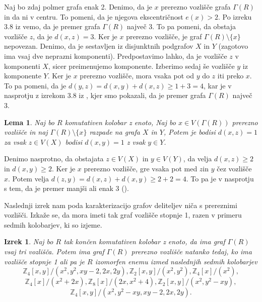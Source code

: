 \documentclass[a4paper, 12pt]{amsart}
\theoremstyle{definition} %
\theoremstyle{plain} %
\newtheorem{lema}[definicija]{Lema}
\newtheorem{izrek}[definicija]{Izrek}
\newcommand{\Z}{\mathbb Z}
\begin{document}
Naj bo zdaj polmer grafa enak 2. Denimo, da je $x$ prerezno vozlišče grafa $\Gamma(R)$ in da ni v centru. To pomeni, da je njegova ekscentričnost $e(x) > 2$. Po izreku 3.8 iz \cite{diploma} vemo, da je premer grafa $\Gamma(R)$ največ 3. To pa pomeni, da obstaja vozlišče $z$, da je $d(x,z) = 3$. Ker je $x$ prerezno vozlišče, je graf $\Gamma(R) \setminus \{x\}$ nepovezan. Denimo, da je sestavljen iz disjunktnih podgrafov $X$ in $Y$ (zagotovo ima vsaj dve neprazni komponenti). Predpostavimo lahko, da je vozlišče $z$ v komponenti $X$, sicer preimenujemo komponente. Izberimo sedaj še vozlišče $y$ iz komponente $Y$. Ker je $x$ prerezno vozlišče, mora vsaka pot od $y$ do $z$ iti preko $x$. To pa pomeni, da je $d(y,z) = d(x,y) + d(x,z) \ge 1 + 3 = 4$, kar je v nasprotju z izrekom 3.8 iz \cite{diploma}, kjer smo pokazali, da je premer grafa $\Gamma(R)$ največ 3.  
\endproof

\begin{lema}
Naj bo $R$ komutativen kolobar z enoto, Naj bo $x\in V(\Gamma(R))$ prerezno vozlišče in naj $\Gamma(R) \setminus \{x\}$ razpade na grafa $X$ in $Y$, Potem je bodisi $d(x,z)= 1$ za vsak $z\in V(X)$ bodisi $d(x,y) = 1$ z vsak $y\in Y$.
\end{lema}

\proof
Denimo nasprotno, da obstajata $z\in V(X)$ in $y\in V(Y)$, da velja $d(x,z)\ge2$ in $d(x,y)\ge 2$. Ker je $x$ prerezno vozlišče, gre vsaka pot med $z$in $y$ čez vozlišče $x$. Potem velja $d(z,y)= d(x,z) + d(x,y) \ge 2 + 2 =4 $. To pa je v nasprotju s tem, da je premer manjši ali enak 3 (\cite{diploma}).
\endproof

Naslednji izrek nam poda karakterizacijo grafov deliteljev niča s prereznimi vozlišči. Izkaže se, da mora imeti tak graf vozlišče stopnje 1, razen v primeru sedmih kolobarjev, ki so izjeme.

\begin{izrek}
\label{izrek-cutVertex}
Naj bo $R$ tak končen komutativen kolobar z enoto, da ima graf $\Gamma(R)$ vsaj tri vozlišča. Potem ima graf $\Gamma(R)$ prerezno vozlišče natanko tedaj, ko ima vozlišče stopnje 1 ali pa je $R$ izomorfen enemu izmed naslednjih sedmih kolobarjev
$$
\Z_4[x,y]/(x^2, y^2, xy-2,2x,2y), \Z_2[x,y]/(x^2,y^2), \Z_4[x]/(x^2),
$$
$$
\Z_4[x]/(x^2+2x), \Z_8[x]/(2x,x^2 + 4), \Z_2[x,y]/(x^2, y^2 - xy),
$$
$$
\Z_4[x,y]/(x^2, y^2 - xy, xy-2,2x,2y).
$$
\end{izrek}
\end{document}

